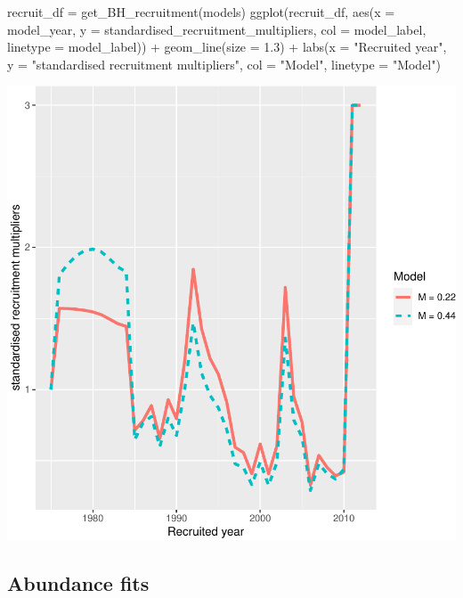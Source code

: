 \documentclass[
]{book}
\newenvironment{Shaded}{\begin{snugshade}}{\end{snugshade}}
\newcommand{\AttributeTok}[1]{\textcolor[rgb]{0.77,0.63,0.00}{#1}}
\newcommand{\FloatTok}[1]{\textcolor[rgb]{0.00,0.00,0.81}{#1}}
\newcommand{\FunctionTok}[1]{\textcolor[rgb]{0.00,0.00,0.00}{#1}}
\newcommand{\NormalTok}[1]{#1}
\newcommand{\OtherTok}[1]{\textcolor[rgb]{0.56,0.35,0.01}{#1}}
\newcommand{\SpecialCharTok}[1]{\textcolor[rgb]{0.00,0.00,0.00}{#1}}
\newcommand{\StringTok}[1]{\textcolor[rgb]{0.31,0.60,0.02}{#1}}
\begin{document}
\begin{Shaded}
\begin{Highlighting}[]
\NormalTok{recruit\_df }\OtherTok{=} \FunctionTok{get\_BH\_recruitment}\NormalTok{(models)}
\FunctionTok{ggplot}\NormalTok{(recruit\_df, }\FunctionTok{aes}\NormalTok{(}\AttributeTok{x =}\NormalTok{ model\_year, }\AttributeTok{y =}\NormalTok{ standardised\_recruitment\_multipliers, }\AttributeTok{col =}\NormalTok{ model\_label, }\AttributeTok{linetype =}\NormalTok{ model\_label)) }\SpecialCharTok{+}
  \FunctionTok{geom\_line}\NormalTok{(}\AttributeTok{size =} \FloatTok{1.3}\NormalTok{) }\SpecialCharTok{+}
  \FunctionTok{labs}\NormalTok{(}\AttributeTok{x =} \StringTok{"Recruited year"}\NormalTok{, }\AttributeTok{y =} \StringTok{"standardised recruitment multipliers"}\NormalTok{, }\AttributeTok{col =} \StringTok{"Model"}\NormalTok{, }\AttributeTok{linetype =} \StringTok{"Model"}\NormalTok{)}
\end{Highlighting}
\end{Shaded}

\includegraphics{_main_files/figure-latex/compare_recruit-1.pdf}

\hypertarget{abundance-fits}{%
\subsection{Abundance fits}\label{abundance-fits}}
\end{document}
